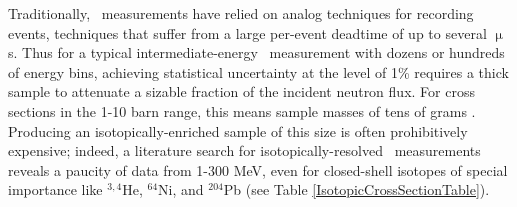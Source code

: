 Traditionally, \tot\ measurements have relied on analog techniques for recording
events, techniques that suffer from a large per-event deadtime of
up to several $\upmu$s. Thus for a typical intermediate-energy \tot\ measurement
with dozens or hundreds of energy bins, achieving statistical uncertainty at the
level of 1\% requires a thick sample to attenuate a sizable fraction of the
incident neutron flux. For cross sections in the 1-10 barn range, this means
sample masses of tens of grams \cite{Finlay1993, Abfalterer2001}.
Producing an isotopically-enriched sample of this size is often
prohibitively expensive; indeed, a literature search for isotopically-resolved
\tot\ measurements reveals a paucity of data from 1-300 MeV, even for
closed-shell isotopes of special importance like $^{3,4}$He, $^{64}$Ni, and
$^{204}$Pb (see Table \ref{IsotopicCrossSectionTable}).

